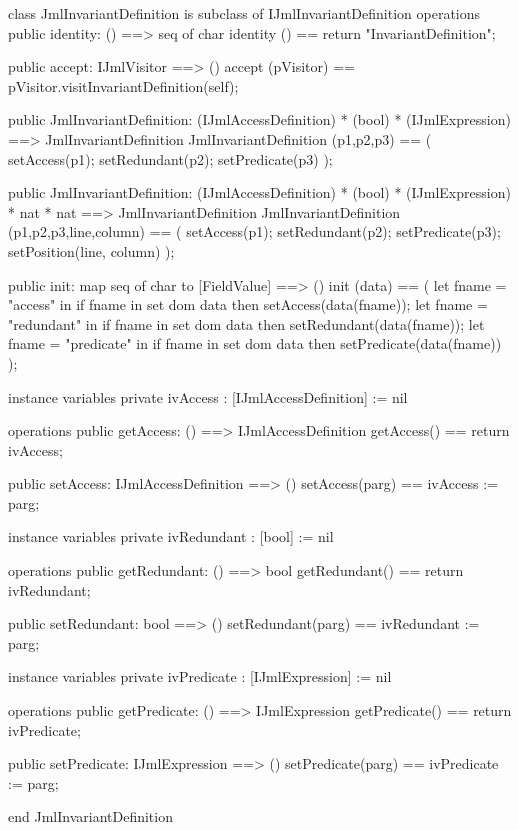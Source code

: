 \begin{vdm_al}
class JmlInvariantDefinition is subclass of IJmlInvariantDefinition
operations
  public identity: () ==> seq of char
  identity () == return "InvariantDefinition";

  public accept: IJmlVisitor ==> ()
  accept (pVisitor) == pVisitor.visitInvariantDefinition(self);

  public JmlInvariantDefinition:
    (IJmlAccessDefinition) *
    (bool) *
    (IJmlExpression) ==> JmlInvariantDefinition
  JmlInvariantDefinition (p1,p2,p3) == 
    ( setAccess(p1);
      setRedundant(p2);
      setPredicate(p3) );

  public JmlInvariantDefinition:
    (IJmlAccessDefinition) *
    (bool) *
    (IJmlExpression) *
    nat *
    nat ==> JmlInvariantDefinition
  JmlInvariantDefinition (p1,p2,p3,line,column) == 
    ( setAccess(p1);
      setRedundant(p2);
      setPredicate(p3);
      setPosition(line, column) );

  public init: map seq of char to [FieldValue] ==> ()
  init (data) ==
    ( let fname = "access" in
        if fname in set dom data
        then setAccess(data(fname));
      let fname = "redundant" in
        if fname in set dom data
        then setRedundant(data(fname));
      let fname = "predicate" in
        if fname in set dom data
        then setPredicate(data(fname)) );

instance variables
  private ivAccess : [IJmlAccessDefinition] := nil

operations
  public getAccess: () ==> IJmlAccessDefinition
  getAccess() == return ivAccess;

  public setAccess: IJmlAccessDefinition ==> ()
  setAccess(parg) == ivAccess := parg;

instance variables
  private ivRedundant : [bool] := nil

operations
  public getRedundant: () ==> bool
  getRedundant() == return ivRedundant;

  public setRedundant: bool ==> ()
  setRedundant(parg) == ivRedundant := parg;

instance variables
  private ivPredicate : [IJmlExpression] := nil

operations
  public getPredicate: () ==> IJmlExpression
  getPredicate() == return ivPredicate;

  public setPredicate: IJmlExpression ==> ()
  setPredicate(parg) == ivPredicate := parg;

end JmlInvariantDefinition
\end{vdm_al}

